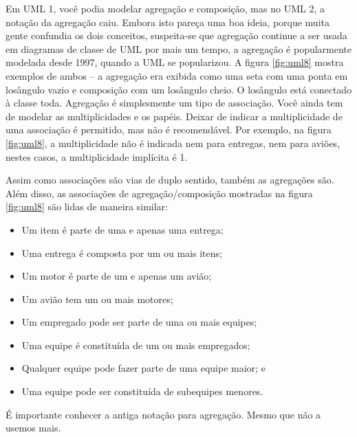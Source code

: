 Em UML 1, você podia modelar agregação e composição, mas no UML 2, a notação da agregação caiu. Embora isto pareça uma boa ideia, porque muita gente confundia os dois conceitos, suspeita-se que agregação continue a ser usada em diagramas de classe de UML por mais um tempo, a agregação é popularmente modelada desde 1997, quando a UML se popularizou. A figura \ref{fig:uml8} mostra exemplos de ambos -- a agregação era exibida como uma seta com uma ponta em losângulo vazio e composição com um losângulo cheio. O losângulo está conectado à classe toda. Agregação é simplesmente um tipo de associação. Você ainda tem de modelar as multiplicidades e os papéis. Deixar de indicar a multiplicidade de uma associação é permitido, mas não é recomendável. Por exemplo, na figura \ref{fig:uml8}, a multiplicidade não é indicada nem para entregas, nem para aviões, nestes casos, a multiplicidade implícita é 1.

Assim como associações são vias de duplo sentido, também as agregações são. Além disso, as associações de agregação/composição mostradas na figura \ref{fig:uml8} são lidas de maneira similar:
\begin{itemize}
\item Um item é parte de uma e apenas uma entrega;
\item Uma entrega é composta por um ou mais itens;
\item Um motor é parte de um e apenas um avião;
\item Um avião tem um ou mais motores;
\item Um empregado pode ser parte de uma ou mais equipes;
\item Uma equipe é constituída de um ou mais empregados;
\item Qualquer equipe pode fazer parte de uma equipe maior; e
\item Uma equipe pode ser constituída de subequipes menores.
\end{itemize}

É importante conhecer a antiga notação para agregação. Mesmo que não a usemos mais.

